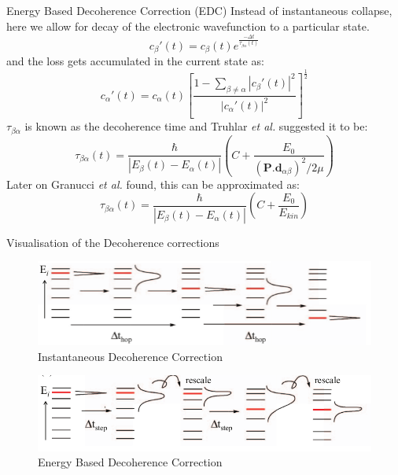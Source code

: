 \documentclass{beamer}
\begin{document}
	\begin{frame}[t]{Energy Based Decoherence Correction (EDC)}
	Instead of instantaneous collapse, here we allow for decay of the electronic wavefunction to a particular state.
	\begin{equation}\label{eq:16}
	c_\beta'(t) = c_\beta(t)e^{\frac{-\Delta t}{\tau_{\beta\alpha}(t)}}
    \end{equation}
    and the loss gets accumulated in the current state as:
    \begin{equation}\label{eq:17}
    c_\alpha'(t) = c_\alpha(t)\left[\frac{1-\sum_{\beta\neq\alpha}|c_\beta'(t)|^2}{|c_\alpha'(t)|^2}\right]^{\frac{1}{2}}
    \end{equation}    	 
    $\tau_{\beta\alpha}$ is known as the decoherence time and Truhlar \textit{et al.} suggested it to be:
    \begin{equation}\label{eq:18}
    \tau_{\beta\alpha}(t) = \frac{\hbar}{|E_\beta(t)-E_\alpha(t)|}\left(C+\frac{E_0}{(\textbf{P}\textbf{.}\textbf{d}_{\alpha\beta})^2/2\mu}\right)
    \end{equation}
    Later on Granucci \textit{et al.} found, this can be approximated as:
    \begin{equation}\label{eq:19}
    \tau_{\beta\alpha}(t) = \frac{\hbar}{|E_\beta(t)-E_\alpha(t)|}\left(C+\frac{E_0}{E_{kin}}\right)
    \end{equation}
	\end{frame}
	
	\begin{frame}[t]{Visualisation of the Decoherence corrections}
	\begin{figure}
	\includegraphics[scale=0.5]{IDC.png}
	\caption{Instantaneous Decoherence Correction}
	\end{figure}
	\begin{figure}
	\includegraphics[scale=0.5]{EDC.png}
	\caption{Energy Based Decoherence Correction}
	\end{figure}
	\end{frame}
	
\end{document}
